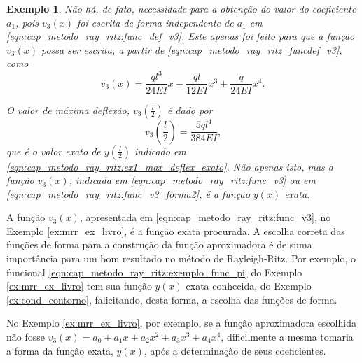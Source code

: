 \documentclass[
	12pt,				%
	openright,			%
    twoside,			%
	a4paper,			%
	english,			%
	french,				%
	spanish,			%
	brazil				%
	]{abntex2}
\newtheorem{exemplo}{Exemplo}
\numberwithin{lema}{chapter}
\numberwithin{teorema}{chapter}
\numberwithin{definicao}{chapter}
\numberwithin{exemplo}{chapter}
\numberwithin{figure}{chapter}
\begin{document}
\begin{exemplo}
	Não há, de fato, necessidade para a obtenção do valor do coeficiente $a_1$, pois $v_3(x)$ foi escrita de forma independente de $a_1$ em \eqref{eqn:cap_metodo_ray_ritz:func_def_v3}. Este apenas foi feito para que a função $v_3(x)$ possa ser escrita, a partir de \eqref{eqn:cap_metodo_ray_ritz_funcdef_v3}, como
	\begin{equation}
		\label{eqn:cap_metodo_ray_ritz:func_v3_forma2}
		v_3(x)=
			\frac{ql^3}{24EI} x
			-
			\frac{ql}{12EI} x^3
			+
			\frac{q}{24EI} x^4
		\text{.}
	\end{equation}


	O valor de máxima deflexão, $v_3(\frac{l}{2})$ é dado por
	$$
		v_3(\frac{l}{2})=\frac{5ql^4}{384EI}
		\text{,}
	$$
	que é o valor exato de $y(\frac{l}{2})$ indicado em \eqref{eqn:cap_metodo_ray_ritz:ex1_max_deflex_exato}. Não apenas isto, mas a função $v_3(x)$, indicada em \eqref{eqn:cap_metodo_ray_ritz:func_v3} ou em \eqref{eqn:cap_metodo_ray_ritz:func_v3_forma2}, é a função $y(x)$ exata.
	
	
\end{exemplo}

A função $v_3(x)$, apresentada em \eqref{eqn:cap_metodo_ray_ritz:func_v3}, no Exemplo \ref{ex:mrr_ex_livro}, é a função exata procurada. A escolha correta das funções de forma para a construção da função aproximadora é de suma importância para um bom resultado no método de Rayleigh-Ritz. Por exemplo, o funcional \eqref{eqn:cap_metodo_ray_ritz:exemplo_func_pi} do Exemplo \ref{ex:mrr_ex_livro} tem sua função $y(x)$ exata conhecida, do Exemplo \ref{ex:cond_contorno}, falicitando, desta forma, a escolha das funções de forma.

No Exemplo \ref{ex:mrr_ex_livro}, por exemplo, se a função aproximadora escolhida não fosse $v_3(x)=a_0+a_1x+a_2x^2+a_3x^3+a_4x^4$, dificilmente a mesma tomaria a forma da função exata, $y(x)$, após a determinação de seus coeficientes.

\end{document}
